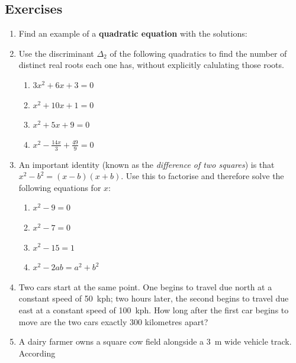 \documentclass[a4paper,10pt,titlepage]{article}
\theoremstyle{definition}
\begin{document}
\subsection*{Exercises}
\begin{enumerate}
  \item Find an example of a \textbf{quadratic equation} with the solutions:
  \item Use the discriminant $ \Delta_2 $ of the following quadratics to find the
        number of distinct real roots each one has, without explicitly calulating
        those roots.
        \begin{enumerate}
          \item $ 3x^2 + 6x + 3 = 0 $
          \item $ x^2 + 10x + 1 = 0 $
          \item $ x^2 + 5x + 9 = 0 $
          \item $ x^2 - \frac{14x}{3} + \frac{49}{9} = 0 $
        \end{enumerate}
  \item An important identity (known as the \emph{difference of two squares})
        is that $ x^2 - b^2 = (x-b)(x+b) $. Use this to factorise and therefore
        solve the following equations for $ x $:
        \begin{enumerate}
          \item $ x^2 - 9 = 0 $
          \item $ x^2 - 7 = 0 $
          \item $ x^2 - 15 = 1 $
          \item $ x^2 - 2ab = a^2 + b^2 $
        \end{enumerate}
  \item Two cars start at the same point. One begins to travel
        due north at a constant speed of 50~kph; two hours later, the second begins
        to travel due east at a constant speed of 100~kph. How long after the first
        car begins to move are the two cars exactly 300 kilometres apart?
  \item A dairy farmer owns a square cow field alongside a 3~m wide vehicle track. According

\end{enumerate}
\end{document}
